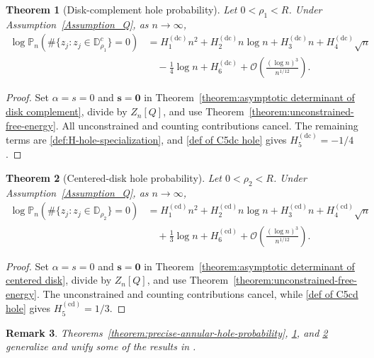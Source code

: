 \documentclass[a4paper]{article}
\newtheorem{theorem}{Theorem}[section]
\newtheorem{remark}[theorem]{Remark}
\numberwithin{equation}{section}
\begin{document}
\begin{theorem}[Disk-complement hole probability]
\label{theorem:precise-disk-complement-hole-probability}
Let $0<\rho_1<R$.  Under Assumption~\ref{Assumption_Q}, as $n\to\infty$,
\begin{align}
\log\mathbb P_n\!\left(\#\{z_j:z_j\in \mathbb{D}_{\rho_1}^c\}=0\right)
&=H_1^{(\mathrm{dc})}n^2
+H_2^{(\mathrm{dc})}n\log n
+H_3^{(\mathrm{dc})}n
+H_4^{(\mathrm{dc})}\sqrt n
\nonumber\\
&\quad
-\frac14\log n+H_6^{(\mathrm{dc})}
+\mathcal O\!\left(\frac{(\log n)^3}{n^{1/12}}\right).
\label{eq:precise-disk-complement-hole-probability}
\end{align}
\end{theorem}

\begin{proof}
Set $\alpha=s=0$ and $\boldsymbol s=\boldsymbol0$ in
Theorem~\ref{theorem:asymptotic determinant of disk complement}, divide by
$Z_n[Q]$, and use Theorem~\ref{theorem:unconstrained-free-energy}.  All
unconstrained and counting contributions cancel.  The remaining terms are
\eqref{def:H-hole-specialization}, and
\eqref{def of C5dc hole} gives $H_5^{(\mathrm{dc})}=-1/4$.
\end{proof}

\begin{theorem}[Centered-disk hole probability]
\label{theorem:precise-centered-disk-hole-probability}
Let $0<\rho_2<R$.  Under Assumption~\ref{Assumption_Q}, as $n\to\infty$,
\begin{align}
\log\mathbb P_n\!\left(\#\{z_j:z_{j}\in\mathbb{D}_{\rho_2}\}=0\right)
&=H_1^{(\mathrm{cd})}n^2
+H_2^{(\mathrm{cd})}n\log n
+H_3^{(\mathrm{cd})}n
+H_4^{(\mathrm{cd})}\sqrt n
\nonumber\\
&\quad
+\frac13\log n+H_6^{(\mathrm{cd})}
+\mathcal O\!\left(\frac{(\log n)^3}{n^{1/12}}\right).
\label{eq:precise-centered-disk-hole-probability}
\end{align}
\end{theorem}

\begin{proof}
Set $\alpha=s=0$ and $\boldsymbol s=\boldsymbol0$ in
Theorem~\ref{theorem:asymptotic determinant of centered disk}, divide by
$Z_n[Q]$, and use Theorem~\ref{theorem:unconstrained-free-energy}.  The
unconstrained and counting contributions cancel, while
\eqref{def of C5cd hole} gives $H_5^{(\mathrm{cd})}=1/3$.
\end{proof}

\begin{remark}
Theorems~\ref{theorem:precise-annular-hole-probability}, \ref{theorem:precise-disk-complement-hole-probability}, and \ref{theorem:precise-centered-disk-hole-probability} generalize and unify some of the results in \cite{C2021}.  
\end{remark}
\end{document}
